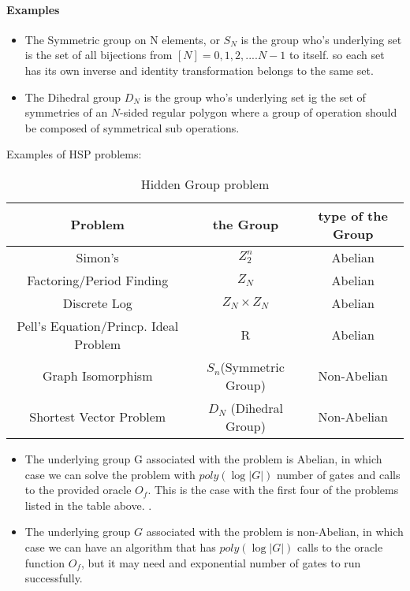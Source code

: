 \documentclass[11pt]{article}
\begin{document}
\paragraph{Examples}
\begin{itemize}
\item The Symmetric group on N elements, or $S_N$ is the group who's
  underlying set is the set of all bijections from
  $[N] = 0, 1, 2, ....N-1$ to itself. so each set has its own inverse
  and identity transformation belongs to the same set.
\item The Dihedral group $D_N$ is the group who's underlying set ig
  the set of symmetries of an $N$-sided regular polygon where a group
  of operation should be composed of symmetrical sub operations.
\end{itemize}

Examples of HSP problems:

\begin{table}[ht]
\caption{Hidden Group problem}
\centering 
\begin{tabular}{c c c}
  \hline
  Problem & the Group & type of the Group \\
  \hline
  Simon's & $Z_2^n$ & Abelian \\
  Factoring/Period Finding & $Z_N$ & Abelian\\
  Discrete Log & $Z_N \times Z_N$ & Abelian\\
  Pell's Equation/Princp. Ideal Problem & R & Abelian\\
  Graph Isomorphism & $S_n$(Symmetric Group) & Non-Abelian\\
  Shortest Vector Problem & $D_N$ (Dihedral Group)& Non-Abelian\\
  \hline
\end{tabular}
\end{table}

\begin{itemize}
\item The underlying group G associated with the problem is Abelian,
  in which case we can solve the problem with $poly(\log|G|)$ number
  of gates and calls to the provided oracle $O_f$. This is the case
  with the first four of the problems listed in the table above. 
  \cite{Nielsen:2011:QCQ:1972505}.
\item The underlying group $G$ associated with the problem is
  non-Abelian, in which case we can have an algorithm that has
  $poly(\log|G|)$ calls to the oracle function $O_f$, but it may need
  and exponential number of gates to run successfully.
\end{itemize}
\end{document}
